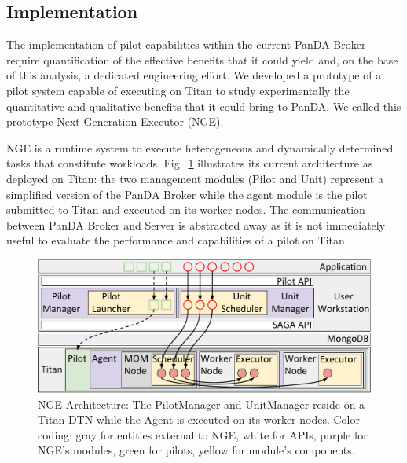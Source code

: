 \subsection{Implementation}
\label{sec:arch}

The implementation of pilot capabilities within the current PanDA Broker require
quantification of the effective benefits that it could yield and, on the base of
this analysis, a dedicated engineering effort. We developed a prototype of a
pilot system capable of executing on Titan to study experimentally the
quantitative and qualitative benefits that it could bring to PanDA. We called
this prototype Next Generation Executor (NGE).

NGE is a runtime system to execute heterogeneous and dynamically determined
tasks that constitute workloads. Fig.~\ref{fig:arch-overview} illustrates its
current architecture as deployed on Titan: the two management modules (Pilot
and Unit) represent a simplified version of the PanDA Broker while the agent
module is the pilot submitted to Titan and executed on its worker nodes. The
communication between PanDA Broker and Server is abstracted away as it
is not immediately useful to evaluate the performance and capabilities of a
pilot on Titan.

\begin{figure}
  \centering
   \includegraphics[width=\columnwidth]{figures/rp_architecture_compact_atlaswms_paper.pdf}
  \caption{NGE Architecture: The PilotManager and  UnitManager reside on a Titan
  DTN while the Agent is executed on its worker nodes. Color coding: gray for
  entities external to NGE, white for APIs, purple for NGE's modules, green for
  pilots, yellow for module's components.}
\label{fig:arch-overview}
\end{figure}

